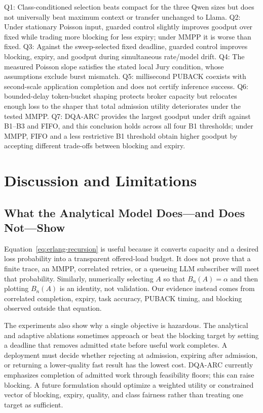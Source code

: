 \documentclass[journal]{IEEEtran}
\newcommand{\method}{DQA-ARC}
\begin{document}
Q1: Class-conditioned selection beats compact for the three Qwen sizes but does not universally beat maximum context or transfer unchanged to Llama. Q2: Under stationary Poisson input, guarded control slightly improves goodput over fixed while trading more blocking for less expiry; under MMPP it is worse than fixed. Q3: Against the sweep-selected fixed deadline, guarded control improves blocking, expiry, and goodput during simultaneous rate/model drift. Q4: The measured Poisson slope satisfies the stated local Jury condition, whose assumptions exclude burst mismatch. Q5: millisecond PUBACK coexists with second-scale application completion and does not certify inference success. Q6: bounded-delay token-bucket shaping protects broker capacity but relocates enough loss to the shaper that total admission utility deteriorates under the tested MMPP. Q7: \method{} provides the largest goodput under drift against B1--B3 and FIFO, and this conclusion holds across all four B1 thresholds; under MMPP, FIFO and a less restrictive B1 threshold obtain higher goodput by accepting different trade-offs between blocking and expiry.
\section{Discussion and Limitations}
\label{sec:discussion}

\subsection{What the Analytical Model Does---and Does Not---Show}

Equation~\eqref{eq:erlang-recursion} is useful because it converts capacity and a desired loss probability into a transparent offered-load budget. It does not prove that a finite trace, an MMPP, correlated retries, or a queueing LLM subscriber will meet that probability. Similarly, numerically selecting $A$ so that $B_n(A)=\alpha$ and then plotting $B_n(A)$ is an identity, not validation. Our evidence instead comes from correlated completion, expiry, task accuracy, PUBACK timing, and blocking observed outside that equation.

The experiments also show why a single objective is hazardous. The analytical and adaptive ablations sometimes approach or beat the blocking target by setting a deadline that removes admitted state before useful work completes. A deployment must decide whether rejecting at admission, expiring after admission, or returning a lower-quality fast result has the lowest cost. \method{} currently emphasizes completion of admitted work through feasibility floors; this can raise blocking. A future formulation should optimize a weighted utility or constrained vector of blocking, expiry, quality, and class fairness rather than treating one target as sufficient.
\end{document}

